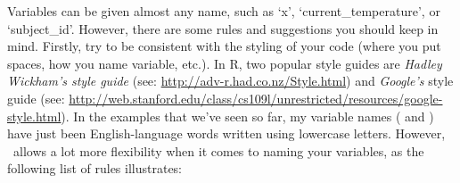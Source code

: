 Variables can be given almost any name, such as `x', `current\_temperature', or `subject\_id'. However, there are some rules and suggestions you should keep in mind.
Firstly, try to be consistent with the styling of your code (where you put spaces, how you name variable, etc.). In R, two popular style guides are \textit{Hadley Wickham's style guide} (see: \websmall\url{http://adv-r.had.co.nz/Style.html}) and \textit{Google's} style guide (see:  \websmall\url{http://web.stanford.edu/class/cs109l/unrestricted/resources/google-style.html}).
In the examples that we've seen so far, my variable names ( and ) have just been English-language words written using lowercase letters. However, \R\ allows a lot more flexibility when it comes to naming your variables, as the following list of rules illustrates:


